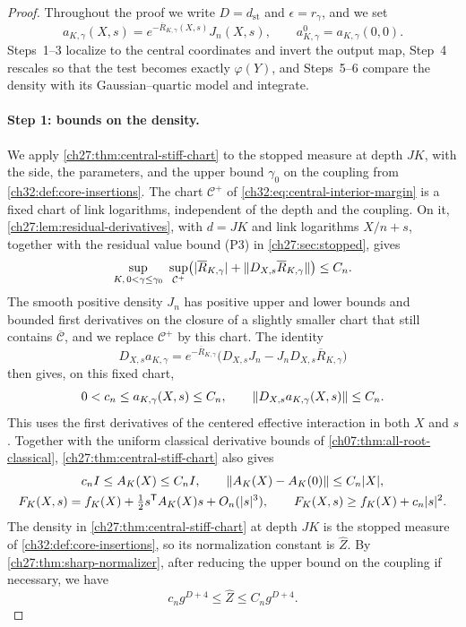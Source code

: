 \begin{proof}
Throughout the proof we write $D=d_{\mathrm{st}}$ and $\epsilon=r_\gamma$, and we set
\[
 a_{K,\gamma}(X,s)=e^{-\overline R_{K,\gamma}(X,s)}J_n(X,s),\qquad a^0_{K,\gamma}=a_{K,\gamma}(0,0).
\]
Steps~1--3 localize to the central coordinates and invert the output map, Step~4 rescales so that the test becomes exactly $\varphi(Y)$, and Steps~5--6 compare the density with its Gaussian--quartic model and integrate.

\paragraph{Step 1: bounds on the density.}
We apply \cref{ch27:thm:central-stiff-chart} to the stopped measure at depth $JK$, with the side, the parameters, and the upper bound $\gamma_0$ on the coupling from \cref{ch32:def:core-insertions}. The chart $\mathcal C^+$ of \eqref{ch32:eq:central-interior-margin} is a fixed chart of link logarithms, independent of the depth and the coupling. On it, \cref{ch27:lem:residual-derivatives}, with $d=JK$ and link logarithms $X/n+s$, together with the residual value bound (P3) in \cref{ch27:sec:stopped}, gives
\[
 \sup_{K,\,0<\gamma\le\gamma_0}\ \sup_{\mathcal C^+}\bigl(\lvert \overline R_{K,\gamma}\rvert+\lVert D_{X,s}\overline R_{K,\gamma}\rVert\bigr)\le C_n.
\]
The smooth positive density $J_n$ has positive upper and lower bounds and bounded first derivatives on the closure of a slightly smaller chart that still contains $\overline{\mathcal C}$, and we replace $\mathcal C^+$ by this chart. The identity
\[
 D_{X,s}a_{K,\gamma}=e^{-\overline R_{K,\gamma}}\bigl(D_{X,s}J_n-J_nD_{X,s}\overline R_{K,\gamma}\bigr)
\]
then gives, on this fixed chart,
\begin{equation}\label{ch32:eq:complete-amplitude}
 0<c_n\le a_{K,\gamma}(X,s)\le C_n,\qquad\lVert D_{X,s}a_{K,\gamma}(X,s)\rVert\le C_n.
\end{equation}
This uses the first derivatives of the centered effective interaction in both $X$ and $s$. Together with the uniform classical derivative bounds of \cref{ch07:thm:all-root-classical}, \cref{ch27:thm:central-stiff-chart} also gives
\begin{equation}\label{ch32:eq:stiff-bounds}
 \begin{gathered}
 c_nI\le A_K(X)\le C_nI,\qquad\lVert A_K(X)-A_K(0)\rVert\le C_n\lvert X\rvert,\\
 F_K(X,s)=f_K(X)+\tfrac12s^{\mathsf T}A_K(X)s+O_n(\lvert s\rvert^3),\qquad F_K(X,s)\ge f_K(X)+c_n\lvert s\rvert^2.
 \end{gathered}
\end{equation}
The density in \cref{ch27:thm:central-stiff-chart} at depth $JK$ is the stopped measure of \cref{ch32:def:core-insertions}, so its normalization constant is $\widehat Z$. By \cref{ch27:thm:sharp-normalizer}, after reducing the upper bound on the coupling if necessary, we have
\begin{equation}\label{ch32:eq:normalizer}
 c_ng^{D+4}\le\widehat Z\le C_ng^{D+4}.
\end{equation}


\end{proof}
